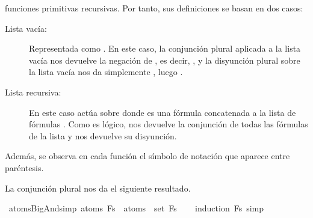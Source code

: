 \begin{isabellebody}
\begin{isamarkuptext}
  funciones primitivas recursivas. Por tanto, sus definiciones se basan 
  en dos casos:
  \begin{description}
    \item[Lista vacía:] Representada como . En este caso, la 
      conjunción plural aplicada a la lista vacía nos devuelve la 
      negación de , es decir, , y la disyunción plural 
      sobre la lista vacía nos da simplemente , luego . 
    \item[Lista recursiva:] En este caso actúa sobre  donde  
      es una fórmula concatenada a la lista de fórmulas . Como es 
      lógico,  nos devuelve la conjunción de todas las 
      fórmulas de la lista y  nos devuelve su disyunción.
  \end{description}

  Además, se observa en cada función el símbolo de notación que aparece 
  entre paréntesis.

  La conjunción plural nos da el siguiente resultado.%
\end{isamarkuptext}\isamarkuptrue%
\isamarkupfalse%
\ atoms{\isacharunderscore}BigAnd{\isacharbrackleft}simp{\isacharbrackright}{\isacharcolon}\ {\isachardoublequoteopen}atoms\ {\isacharparenleft}\isactrlbold {\isasymAnd}Fs{\isacharparenright}\ {\isacharequal}\ {\isasymUnion}{\isacharparenleft}atoms\ {\isacharbackquote}\ set\ Fs{\isacharparenright}{\isachardoublequoteclose}\isanewline
%
\isadelimproof
\ \ %
\endisadelimproof
%
\isatagproof
{}\isamarkupfalse%
\ {\isacharparenleft}induction\ Fs{\isacharsemicolon}\ simp{\isacharparenright}\isanewline
\isanewline
%
\endisatagproof
{\isafoldproof}%
%
\isadelimproof
%
\endisadelimproof
%
\isadelimtheory
%
\endisadelimtheory
%
\isatagtheory
%
\endisatagtheory
{\isafoldtheory}%
%
\isadelimtheory
%
\endisadelimtheory
%
\end{isabellebody}%
\endinput
